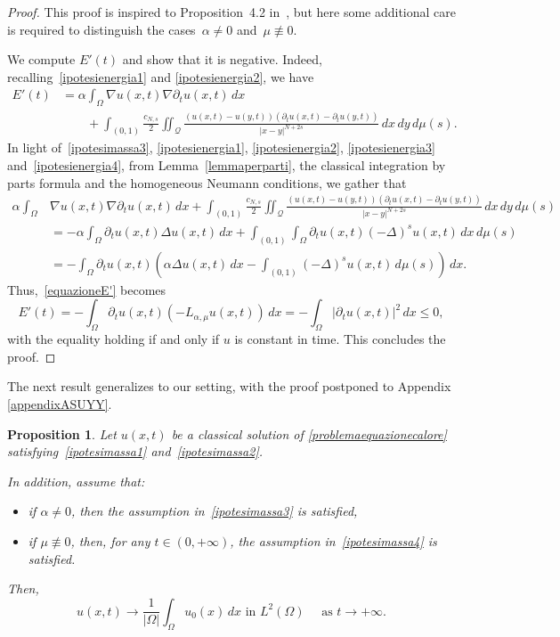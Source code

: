 \documentclass[12pt,a4paper,intlimits,sumlimits]{amsart}
\def \Q {\mathcal Q}
\theoremstyle{definition}
\theoremstyle{plain}
\newtheorem{proposition}[definition]{Proposition}
\numberwithin{equation}{section}
\renewcommand{\leq}{\leqslant}
\begin{document}
\begin{proof} This proof is inspired to Proposition~4.2 in~\cite{MR3651008}, but here some additional care is required to distinguish the cases~$\alpha\ne0$ and~$\mu\not\equiv0$.

We compute $E'(t)$ and show that it is negative.
Indeed, recalling~\eqref{ipotesienergia1} and
\eqref{ipotesienergia2}, we have
\begin{equation}\label{equazioneE'}
\begin{aligned}
E'(t)&=\alpha\int_\Omega \nabla u(x,t)\nabla \partial_t u(x,t)\,dx 
\\
&\qquad+\int_{(0,1)}\frac{c_{N,s}}{2}
\iint_\Q \frac{(u(x,t)-u(y,t))(\partial_t u(x,t)-\partial_t u(y,t))}{|x-y|^{N+2s}}\,dx\,dy\,d\mu(s).
\end{aligned}
\end{equation}
In light of~\eqref{ipotesimassa3}, \eqref{ipotesienergia1},
\eqref{ipotesienergia2}, \eqref{ipotesienergia3} and~\eqref{ipotesienergia4}, from Lemma~\ref{lemmaperparti}, the 
classical integration by parts formula and the homogeneous Neumann
conditions, we gather that
\[
\begin{aligned}
\alpha\int_\Omega &\nabla u(x,t)\nabla \partial_t u(x,t)\,dx 
+\int_{(0,1)}\frac{c_{N,s}}{2}
\iint_\Q \frac{(u(x,t)-u(y,t))(\partial_t u(x,t)-\partial_t u(y,t))}{|x-y|^{N+2s}}\,dx\,dy\,d\mu(s) \\
&=-\alpha \int_\Omega \partial_t u(x,t) \Delta u(x,t)\,dx
+\int_{(0,1)} \int_\Omega \partial_t u(x,t) (-\Delta)^s u(x,t)\,dx\,d\mu(s) \\
&=- \int_\Omega \partial_t u(x,t)
\left(\alpha\Delta u(x,t)\,dx -\int_{(0,1)}(-\Delta)^s u(x,t)\,d\mu(s)\right) \,dx.
\end{aligned}
\]
Thus,~\eqref{equazioneE'} becomes
\[
E'(t)=- \int_\Omega \partial_t u(x,t)
\left(-L_{\alpha,\mu}u(x,t) \right)\,dx
=- \int_\Omega |\partial_t u(x,t)|^2\,dx\leq 0,
\]
with the equality holding if and only if $u$ is constant in time.  This concludes the proof.
\end{proof}

The next result generalizes \cite[Proposition 4.3]{MR3651008} to our setting, with the proof postponed to Appendix \ref{appendixASUYY}.

\begin{proposition}\label{ASUYY}
Let $u(x,t)$ be a classical solution of
\eqref{problemaequazionecalore} satisfying~\eqref{ipotesimassa1}
and~\eqref{ipotesimassa2}.

In addition, assume that:
\begin{itemize}
\item if $\alpha\neq 0$, then the assumption in~\eqref{ipotesimassa3} is satisfied,
\item if $\mu \not \equiv 0$, then, for any $t\in (0,+\infty)$, the assumption in~\eqref{ipotesimassa4} is satisfied.
\end{itemize}

Then,
\[
u(x,t) \to \frac{1}{|\Omega|}
\int_\Omega u_0(x)\,dx \mbox{ in } L^2(\Omega) \quad\mbox{ as } t\to +\infty.
\]
\end{proposition}
\end{document}

